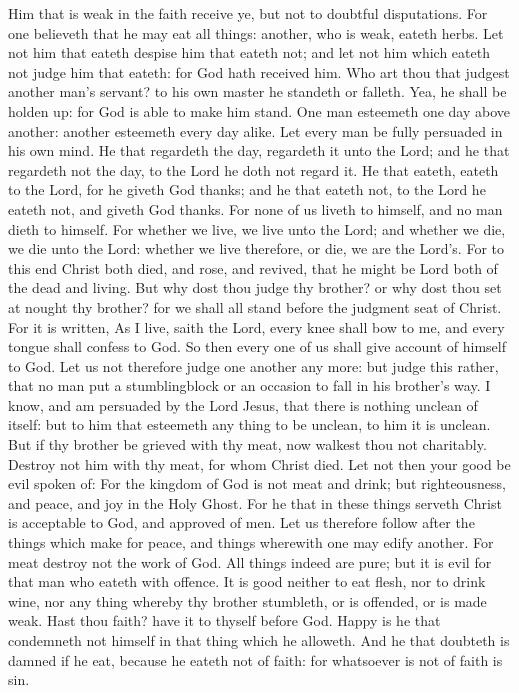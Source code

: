  Him that is weak in the faith receive ye, but not to
doubtful disputations.  For one believeth that he may eat
all things: another, who is weak, eateth herbs.  Let not him
that eateth despise him that eateth not; and let not him which eateth
not judge him that eateth: for God hath received him.  Who
art thou that judgest another man's servant? to his own master he
standeth or falleth. Yea, he shall be holden up: for God is able to make
him stand.  One man esteemeth one day above another: another
esteemeth every day alike. Let every man be fully persuaded in his own
mind.  He that regardeth the day, regardeth it unto the
Lord; and he that regardeth not the day, to the Lord he doth not regard
it. He that eateth, eateth to the Lord, for he giveth God thanks; and he
that eateth not, to the Lord he eateth not, and giveth God thanks.
 For none of us liveth to himself, and no man dieth to
himself.  For whether we live, we live unto the Lord; and
whether we die, we die unto the Lord: whether we live therefore, or die,
we are the Lord's.  For to this end Christ both died, and
rose, and revived, that he might be Lord both of the dead and living.
 But why dost thou judge thy brother? or why dost thou set
at nought thy brother? for we shall all stand before the judgment seat
of Christ.  For it is written, As I live, saith the Lord,
every knee shall bow to me, and every tongue shall confess to God.
 So then every one of us shall give account of himself to
God.  Let us not therefore judge one another any more: but
judge this rather, that no man put a stumblingblock or an occasion to
fall in his brother's way.  I know, and am persuaded by the
Lord Jesus, that there is nothing unclean of itself: but to him that
esteemeth any thing to be unclean, to him it is unclean. 
But if thy brother be grieved with thy meat, now walkest thou not
charitably. Destroy not him with thy meat, for whom Christ died.
 Let not then your good be evil spoken of: 
For the kingdom of God is not meat and drink; but righteousness, and
peace, and joy in the Holy Ghost.  For he that in these
things serveth Christ is acceptable to God, and approved of men.
 Let us therefore follow after the things which make for
peace, and things wherewith one may edify another.  For
meat destroy not the work of God. All things indeed are pure; but it is
evil for that man who eateth with offence.  It is good
neither to eat flesh, nor to drink wine, nor any thing whereby thy
brother stumbleth, or is offended, or is made weak.  Hast
thou faith? have it to thyself before God. Happy is he that condemneth
not himself in that thing which he alloweth.  And he that
doubteth is damned if he eat, because he eateth not of faith: for
whatsoever is not of faith is sin.

